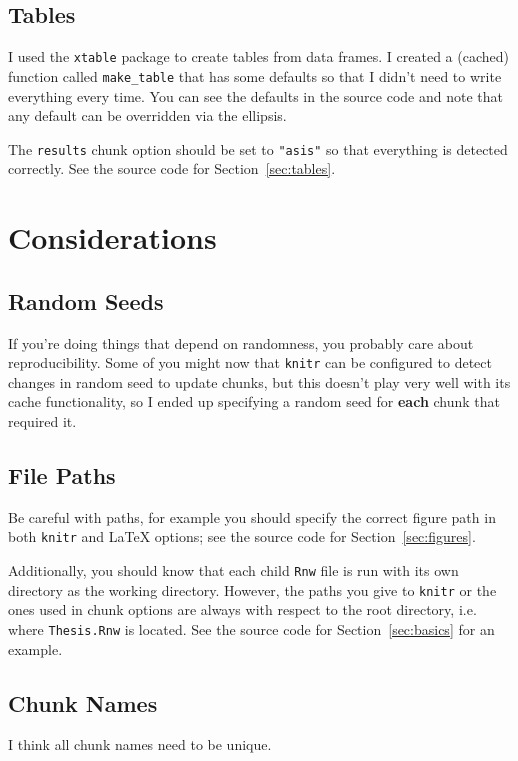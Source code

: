 \subsection{Tables}

I used the \texttt{xtable} package to create tables from data frames. I created a (cached) function called \texttt{make\_table} that has some defaults so that I didn't need to write everything every time. You can see the defaults in the source code and note that any default can be overridden via the ellipsis.

The \texttt{results} chunk option should be set to \texttt{"asis"} so that everything is detected correctly. See the source code for Section~\ref{sec:tables}.

\section{Considerations}
\label{sec:considerations}

\subsection{Random Seeds}

If you're doing things that depend on randomness, you probably care about reproducibility. Some of you might now that \texttt{knitr} can be configured to detect changes in random seed to update chunks, but this doesn't play very well with its cache functionality, so I ended up specifying a random seed for \textbf{each} chunk that required it.

\subsection{File Paths}

Be careful with paths, for example you should specify the correct figure path in both \texttt{knitr} and \LaTeX{} options; see the source code for Section~\ref{sec:figures}.

Additionally, you should know that each child \texttt{Rnw} file is run with its own directory as the working directory. However, the paths you give to \texttt{knitr} or the ones used in chunk options are always with respect to the root directory, i.e. where \texttt{Thesis.Rnw} is located. See the source code for Section~\ref{sec:basics} for an example.

\subsection{Chunk Names}

I think all chunk names need to be unique.
